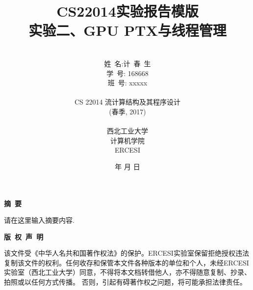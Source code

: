 \documentclass[a4paper]{article}
\begin{document}
\renewcommand{\contentsname}{目\ 录}
\renewcommand{\appendixname}{附录}
\renewcommand{\appendixpagename}{附录}
\renewcommand{\refname}{参考文献} 
\renewcommand{\figurename}{图}
\renewcommand{\tablename}{表}
\renewcommand{\today}{\number\year 年 \number\month 月 \number\day 日}

\title{{\Huge CS22014实验报告模版{\large\linebreak\\}}{\Large 实验二、GPU PTX与线程管理\linebreak\linebreak}}
\author{\\姓\ 名:计\ 春\ 生\\
学\ 号: 168668\\
班\ 号: xxxxx\\\\
CS 22014 流计算结构及其程序设计\\
(春季, 2017)\\\\
西北工业大学\\
计算机学院\\
ERCESI}
\date{\today}
\maketitle
\newpage

\begin{center}
{\Large\bf{摘\ 要\\}}
\end{center}
请在这里输入摘要内容.
\newpage
\begin{center}
{\Large\bf{版\ 权\ 声\ 明\\}}
\end{center}
该文件受《中华人名共和国著作权法》的保护。ERCESI实验室保留拒绝授权违法复制该文件的权利。任何收存和保管本文件各种版本的单位和个人，未经ERCESI实验室（西北工业大学）同意，不得将本文档转借他人，亦不得随意复制、抄录、拍照或以任何方式传播。 否则，引起有碍著作权之问题，将可能承担法律责任。\newpage
\begin{center}
\tableofcontents\label{c}
\end{center}
\newpage

\end{document}
